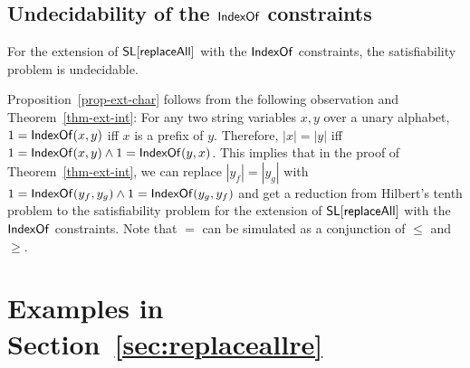 %
%
%
%
%
%
%

\subsection{Undecidability of the $\mathsf{IndexOf}$ constraints}

\begin{proposition}\label{prop-indexof}
	For the extension of $\mathsf{SL}[\mathsf{replaceAll}]$ with the $\mathsf{IndexOf}$ constraints, the satisfiability problem is undecidable. 
\end{proposition}

Proposition~\ref{prop-ext-char} follows from the following observation and Theorem~\ref{thm-ext-int}: For any two string variables $x,y$ over a unary alphabet, 
$1= \mathsf{IndexOf}(x,y)$ iff $x$ is a prefix of $y$. Therefore, $|x| = |y|$ iff $1=  \mathsf{IndexOf}(x,y) \wedge 1= \mathsf{IndexOf}(y,x)$. This implies that in the proof of Theorem~\ref{thm-ext-int}, we can replace $|y_f| = |y_g|$ with $1=\mathsf{IndexOf}(y_f, y_g) \wedge 1 = \mathsf{IndexOf}(y_g, y_f)$ and get a reduction from Hilbert's tenth problem to the satisfiability problem for the extension of $\mathsf{SL}[\mathsf{replaceAll}]$ with the $\mathsf{IndexOf}$ constraints.
Note that $=$ can be simulated as a conjunction of $\leq$ and $\geq$.


%



\def\refsecreplaceallre{\ref{sec:replaceallre}}
\section{Examples in Section~\protect\refsecreplaceallre}

